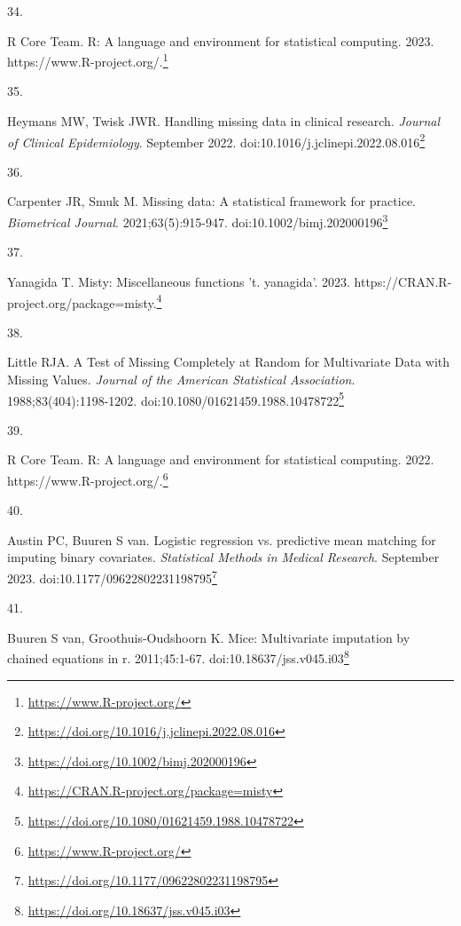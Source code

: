\documentclass[
  a4paper,
]{book}
\newlength{\cslhangindent}
\newlength{\csllabelwidth}
\newlength{\cslentryspacingunit} %
\newenvironment{CSLReferences}[2] %
 {%
  \setlength{\parindent}{0pt}
  \ifodd #1
  \let\oldpar\par
  \def\par{\hangindent=\cslhangindent\oldpar}
  \fi
  \setlength{\parskip}{#2\cslentryspacingunit}
 }%
 {}
\newcommand{\CSLLeftMargin}[1]{\parbox[t]{\csllabelwidth}{#1}}
\newcommand{\CSLRightInline}[1]{\parbox[t]{\linewidth - \csllabelwidth}{#1}\break}
\renewcommand{\href}[2]{#2\footnote{\url{#1}}}
\begin{document}
\begin{CSLReferences}{0}{0}
\leavevmode{}%
\CSLLeftMargin{34. }%
\CSLRightInline{R Core Team. R: A language and environment for statistical computing. 2023. \href{https://www.R-project.org/}{https://www.R-project.org/.}}

\leavevmode{}%
\CSLLeftMargin{35. }%
\CSLRightInline{Heymans MW, Twisk JWR. Handling missing data in clinical research. \emph{Journal of Clinical Epidemiology}. September 2022. doi:\href{https://doi.org/10.1016/j.jclinepi.2022.08.016}{10.1016/j.jclinepi.2022.08.016}}

\leavevmode{}%
\CSLLeftMargin{36. }%
\CSLRightInline{Carpenter JR, Smuk M. Missing data: A statistical framework for practice. \emph{Biometrical Journal}. 2021;63(5):915-947. doi:\href{https://doi.org/10.1002/bimj.202000196}{10.1002/bimj.202000196}}

\leavevmode{}%
\CSLLeftMargin{37. }%
\CSLRightInline{Yanagida T. Misty: Miscellaneous functions 't. yanagida'. 2023. \href{https://CRAN.R-project.org/package=misty}{https://CRAN.R-project.org/package=misty.}}

\leavevmode{}%
\CSLLeftMargin{38. }%
\CSLRightInline{Little RJA. A Test of Missing Completely at Random for Multivariate Data with Missing Values. \emph{Journal of the American Statistical Association}. 1988;83(404):1198-1202. doi:\href{https://doi.org/10.1080/01621459.1988.10478722}{10.1080/01621459.1988.10478722}}

\leavevmode{}%
\CSLLeftMargin{39. }%
\CSLRightInline{R Core Team. R: A language and environment for statistical computing. 2022. \href{https://www.R-project.org/}{https://www.R-project.org/.}}

\leavevmode{}%
\CSLLeftMargin{40. }%
\CSLRightInline{Austin PC, Buuren S van. Logistic regression vs. predictive mean matching for imputing binary covariates. \emph{Statistical Methods in Medical Research}. September 2023. doi:\href{https://doi.org/10.1177/09622802231198795}{10.1177/09622802231198795}}

\leavevmode{}%
\CSLLeftMargin{41. }%
\CSLRightInline{Buuren S van, Groothuis-Oudshoorn K. {\textbraceleft}Mice{\textbraceright}: Multivariate imputation by chained equations in r. 2011;45:1-67. doi:\href{https://doi.org/10.18637/jss.v045.i03}{10.18637/jss.v045.i03}}


\end{CSLReferences}
\end{document}
